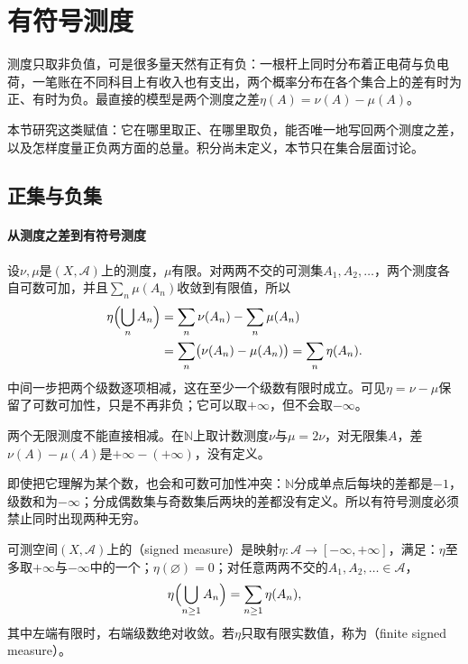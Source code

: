 \section{有符号测度}
\label{sec:meas-signed}

测度只取非负值，可是很多量天然有正有负：一根杆上同时分布着正电荷与负电荷，一笔账在不同科目上有收入也有支出，两个概率分布在各个集合上的差有时为正、有时为负。最直接的模型是两个测度之差$\eta(A)=\nu(A)-\mu(A)$。

本节研究这类赋值：它在哪里取正、在哪里取负，能否唯一地写回两个测度之差，以及怎样度量正负两方面的总量。积分尚未定义，本节只在集合层面讨论。

\subsection{正集与负集}
\label{sec:meas-positive-negative-sets}

\paragraph{从测度之差到有符号测度}
设$\nu,\mu$是$(X,\mathcal A)$上的测度，$\mu$有限。对两两不交的可测集$A_1,A_2,\dots$，两个测度各自可数可加，并且$\sum_n\mu(A_n)$收敛到有限值，所以
\[
\begin{aligned}
 \eta\Bigl(\bigcup_nA_n\Bigr)
 &=\sum_n\nu(A_n)-\sum_n\mu(A_n)\\
 &=\sum_n\bigl(\nu(A_n)-\mu(A_n)\bigr)=\sum_n\eta(A_n).
\end{aligned}
\]
中间一步把两个级数逐项相减，这在至少一个级数有限时成立。可见$\eta=\nu-\mu$保留了可数可加性，只是不再非负；它可以取$+\infty$，但不会取$-\infty$。

两个无限测度不能直接相减。在$\mathbb N$上取计数测度$\nu$与$\mu=2\nu$，对无限集$A$，差$\nu(A)-\mu(A)$是$+\infty-(+\infty)$，没有定义。

即使把它理解为某个数，也会和可数可加性冲突：$\mathbb N$分成单点后每块的差都是$-1$，级数和为$-\infty$；分成偶数集与奇数集后两块的差都没有定义。所以有符号测度必须禁止同时出现两种无穷。

\begin{definition}[有符号测度]
\label{def:meas-signed}
可测空间$(X,\mathcal A)$上的（signed measure）是映射$\eta:\mathcal A\to[-\infty,+\infty]$，满足：$\eta$至多取$+\infty$与$-\infty$中的一个；$\eta(\varnothing)=0$；对任意两两不交的$A_1,A_2,\dots\in\mathcal A$，
\begin{equation}
 \eta\Bigl(\bigcup_{n\geq1}A_n\Bigr)=\sum_{n\geq1}\eta(A_n),
 \label{eq:meas-signed-additivity}
\end{equation}
其中左端有限时，右端级数绝对收敛。若$\eta$只取有限实数值，称为（finite signed measure）。
\end{definition}

